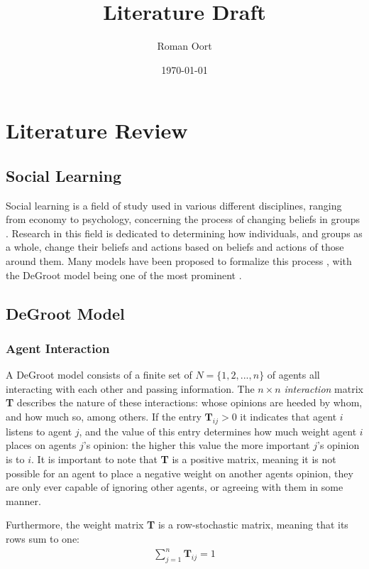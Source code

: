 \documentclass{article}
\title{Literature Draft}
\author{Roman Oort}
\date{\today}
\begin{document}
\maketitle

\tableofcontents

\newpage

\section{Literature Review}

\subsection{Social Learning}
Social learning is a field of study used in various different disciplines, ranging from economy to psychology, concerning the process of changing beliefs in groups \cite{reed2010sociallearning}. Research in this field is dedicated to determining how individuals, and groups as a whole, change their beliefs and actions based on beliefs and actions of those around them. Many models have been proposed to formalize this process \cite{golub2017learning}, with the DeGroot model being one of the most prominent \cite{degroot1974concensus}.

\subsection{DeGroot Model}
\subsubsection{Agent Interaction}
A DeGroot model consists of a finite set of $N=\{1, 2, ..., n\}$ of agents all interacting with each other and passing information. The $n \times n$ \emph{interaction} matrix \textbf{T} describes the nature of these interactions: whose opinions are heeded by whom, and how much so, among others. If the entry $\textbf{T}_{ij} > 0$ it indicates that agent $i$ listens to agent $j$, and the value of this entry determines how much weight agent $i$ places on agents $j$'s opinion: the higher this value the more important $j$'s opinion is to $i$. It is important to note that \textbf{T} is a positive matrix, meaning it is not possible for an agent to place a negative weight on another agents opinion, they are only ever capable of ignoring other agents, or agreeing with them in some manner. 

Furthermore, the weight matrix \textbf{T} is a row-stochastic matrix, meaning that its rows sum to one:
\begin{align*}
    \sum_{j=1}^{n} \textbf{T}_{ij} = 1
\end{align*}
\end{document}
